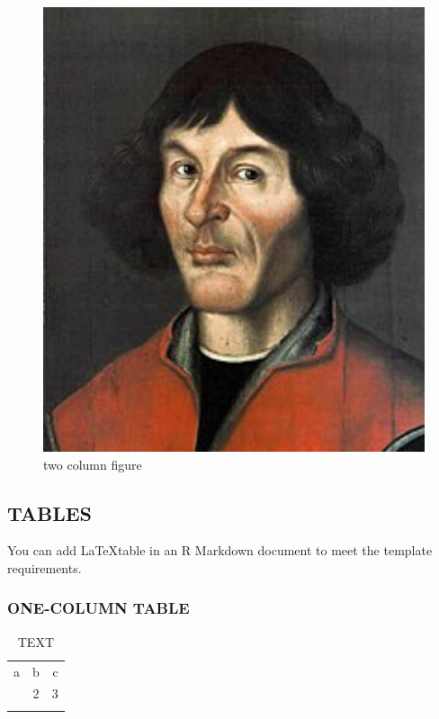 \documentclass[gc, manuscript]{copernicus}
\begin{document}
\begin{figure}
\includegraphics[width=12cm]{Nikolaus_Kopernikus} \caption{two column figure}\label{fig:unnamed-chunk-5}
\end{figure}

\subsection{TABLES}

You can add \LaTeX table in an R Markdown document to meet the template
requirements.

\subsubsection{ONE-COLUMN TABLE}

\begin{table}[t]
\caption{TEXT}
\begin{tabular}{l c r}
\tophline

a & b & c \\
\middlehline
1 & 2 & 3 \\

\bottomhline
\end{tabular}
\end{table}
\end{document}
